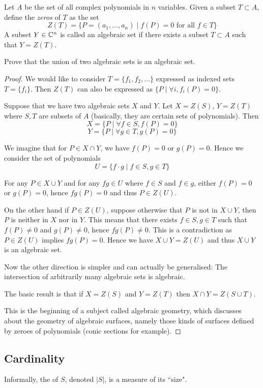 \begin{prbm}
Let $A$ be the set of all complex polynomials in $n$ variables. Given a subset $T \subset A$, define the \textit{zeros} of $T$ as the set
\[ Z(T) = \{P=(a_1,\dots,a_n) \mid f(P)=0 \text{ for all } f \in T\} \]
A subset $Y \in \mathbb C^n$ is called an algebraic set if there exists a subset $T \subset A$ such that $Y=Z(T)$.

Prove that the union of two algebraic sets is an algebraic set.
\end{prbm}
\begin{proof}
We would like to consider $T=\{f_1, f_2, \dots\}$ expressed as indexed sets $T=\{f_i\}$. Then $Z(T)$ can also be expressed as $\{P \mid \forall i, f_i(P)=0\}$.

Suppose that we have two algebraic sets $X$ and $Y$. Let $X=Z(S)$, $Y=Z(T)$ where $S,T$ are subsets of $A$ (basically, they are certain sets of polynomials). Then
\[ X=\{P \mid \forall f \in S, f(P)=0\} \]
\[ Y=\{P \mid \forall g \in T, g(P)=0\} \]

We imagine that for $P\in X\cap Y$, we have $f(P)=0$ or $g(P)=0$. Hence we consider the set of polynomials
\[ U=\{f\cdot g \mid f\in S, g\in T\} \]

For any $P\in X\cup Y$ and for any $fg\in U$ where $f\in S$ and $f\in g$, either $f(P)=0$ or $g(P)=0$, hence $fg(P)=0$ and thus $P\in Z(U)$.

On the other hand if $P\in Z(U)$, suppose otherwise that $P$ is not in $X\cup Y$, then $P$ is neither in $X$ nor in $Y$. This means that there exists $f\in S,g\in T$ such that $f(P)\neq0$ and $g(P)\neq0$, hence $fg(P)\neq0$. This is a contradiction as $P\in Z(U)$ implies $fg(P)=0$. Hence we have $X\cup Y=Z(U)$ and thus $X\cup Y$ is an algebraic set.

Now the other direction is simpler and can actually be generalised: The intersection of arbitrarily many algebraic sets is algebraic. 

The basic result is that if $X=Z(S)$ and $Y=Z(T)$ then $X\cap Y=Z(S\cup T)$. 

This is the beginning of a subject called algebraic geometry, which discusses about the geometry of algebraic surfaces, namely those kinds of surfaces defined by zeroes of polynomials (conic sections for example).
\end{proof}
\pagebreak

\subsection{Cardinality}
Informally, the  of $S$, denoted $|S|$, is a measure of its ``size".

